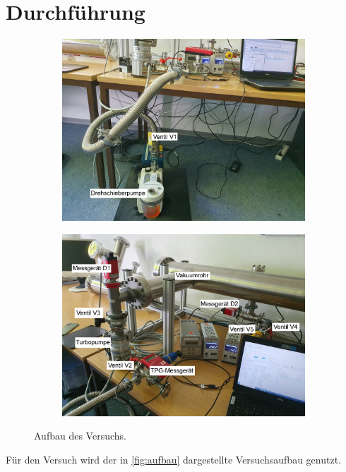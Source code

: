 \section{Durchführung}
\label{sec:Durchführung}

\begin{figure}
    \centering
    \begin{subfigure}{0.4\linewidth}
        \includegraphics[width=\linewidth]{assets/V70_aufbau_2}
    \end{subfigure}
    \begin{subfigure}{0.4\linewidth}
        \includegraphics[width=\linewidth]{assets/V70_aufbau_1}
    \end{subfigure}
    \caption{Aufbau des Versuchs.}
    \label{fig:aufbau}
\end{figure}
Für den Versuch wird der in \autoref{fig:aufbau} dargestellte Versuchsaufbau genutzt.

